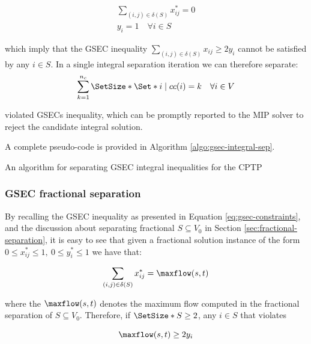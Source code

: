 \begin{align}
	\sum_{(i, j) \in \delta(S)} x^*_{ij} = 0 \\
	y_i =  1 \quad \forall i \in S
\end{align}

which imply that the GSEC inequality $\sum_{(i, j) \in \delta(S)} x_{ij} \ge 2 y_i$ cannot be satisfied by any $i \in S$.
In a single integral separation iteration we can therefore separate:
\begin{equation}
	\sum^{n_c}_{k = 1} \SetSize*{ \Set*{ i \mid cc(i) = k \quad \forall i \in V } }
\end{equation}

violated GSECs inequality, which can be promptly reported to the MIP solver to reject the candidate integral solution.

A complete pseudo-code is provided in Algorithm \ref{algo:gsec-integral-sep}.

\begin{algorithm}
	\caption{An algorithm for separating GSEC integral inequalities for the CPTP}
	\label{algo:gsec-integral-sep}
	
\end{algorithm}


\subsubsection{GSEC fractional separation}\label{sec:gsec-fractional-separation}

By recalling the GSEC inequality as presented in Equation \eqref{eq:gsec-constraints}, and the discussion about separating fractional $S \subseteq V_0$ in Section \ref{sec:fractional-separation}, it is easy to see that given a fractional solution instance of the form $0 \le x^*_{ij} \le 1,\ 0 \le y^*_{i} \le 1$ we have that:

\begin{equation}
	\sum_{(i, j) \in \delta(S)} x^*_{ij} = \maxflow(s, t)
\end{equation}

where the $\maxflow(s, t)$ denotes the maximum flow computed in the fractional separation of $S \subseteq V_0$.
Therefore, if $\SetSize*{S} \ge 2$, any $i \in S$ that violates

\begin{equation}
	\maxflow(s, t) \ge 2 y_i
\end{equation}

